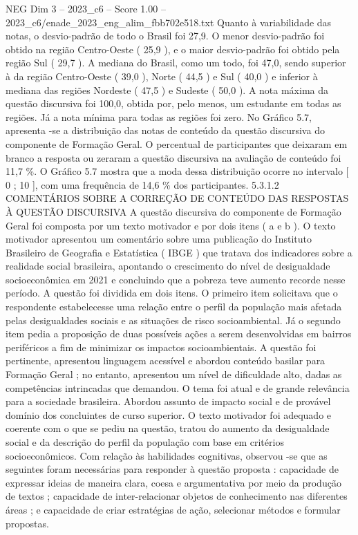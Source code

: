 \begin{textsample}{NEG Dim 3 – 2023\_c6 – Score 1.00 – 2023\_c6/enade\_2023\_eng\_alim\_fbb702e518.txt}
Quanto à variabilidade das notas, o desvio-padrão de todo o Brasil foi 27,9.
O menor desvio-padrão foi obtido na região Centro-Oeste ( 25,9 ), e o maior desvio-padrão foi obtido pela região Sul ( 29,7 ).
A mediana do Brasil, como um todo, foi 47,0, sendo superior à da região Centro-Oeste ( 39,0 ), Norte ( 44,5 ) e Sul ( 40,0 ) e inferior à mediana das regiões Nordeste ( 47,5 ) e Sudeste ( 50,0 ).
A nota máxima da questão discursiva foi 100,0, obtida por, pelo menos, um estudante em todas as regiões.
Já a nota mínima para todas as regiões foi zero.
No Gráfico 5.7, apresenta -se a distribuição das notas de conteúdo da questão discursiva do componente de Formação Geral.
O percentual de participantes que deixaram em branco a resposta ou zeraram a questão discursiva na avaliação de conteúdo foi 11,7 \%.
O Gráfico 5.7 mostra que a moda dessa distribuição ocorre no intervalo [ 0 ; 10 ], com uma frequência de 14,6 \% dos participantes. 5.3.1.2 COMENTÁRIOS SOBRE A CORREÇÃO DE CONTEÚDO DAS RESPOSTAS À QUESTÃO DISCURSIVA A questão discursiva do componente de Formação Geral foi composta por um texto motivador e por dois itens ( a e b ).
O texto motivador apresentou um comentário sobre uma publicação do Instituto Brasileiro de Geografia e Estatística ( IBGE ) que tratava dos indicadores sobre a realidade social brasileira, apontando o crescimento do nível de desigualdade socioeconômica em 2021 e concluindo que a pobreza teve aumento recorde nesse período.
A questão foi dividida em dois itens.
O primeiro item solicitava que o respondente estabelecesse uma relação entre o perfil da população mais afetada pelas desigualdades sociais e as situações de risco socioambiental.
Já o segundo item pedia a proposição de duas possíveis ações a serem desenvolvidas em bairros periféricos a fim de minimizar os impactos socioambientais.
A questão foi pertinente, apresentou linguagem acessível e abordou conteúdo basilar para Formação Geral ; no entanto, apresentou um nível de dificuldade alto, dadas as competências intrincadas que demandou.
O tema foi atual e de grande relevância para a sociedade brasileira.
Abordou assunto de impacto social e de provável domínio dos concluintes de curso superior.
O texto motivador foi adequado e coerente com o que se pediu na questão, tratou do aumento da desigualdade social e da descrição do perfil da população com base em critérios socioeconômicos.
Com relação às habilidades cognitivas, observou -se que as seguintes foram necessárias para responder à questão proposta : capacidade de expressar ideias de maneira clara, coesa e argumentativa por meio da produção de textos ; capacidade de inter-relacionar objetos de conhecimento nas diferentes áreas ; e capacidade de criar estratégias de ação, selecionar métodos e formular propostas.

\end{textsample}
